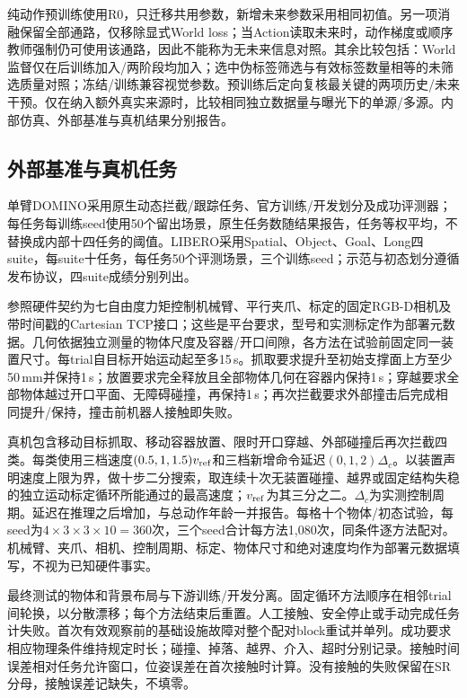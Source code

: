 纯动作预训练使用R0，只迁移共用参数，新增未来参数采用相同初值。另一项消融保留全部通路，仅移除显式World loss；当Action读取未来时，动作梯度或顺序教师强制仍可使用该通路，因此不能称为无未来信息对照。其余比较包括：World监督仅在后训练加入/两阶段均加入；选中伪标签筛选与有效标签数量相等的未筛选质量对照；冻结/训练兼容视觉参数。预训练后定向复核最关键的两项历史/未来干预。仅在纳入额外真实来源时，比较相同独立数据量与曝光下的单源/多源。内部仿真、外部基准与真机结果分别报告。



\subsection{外部基准与真机任务}
单臂DOMINO\cite{domino}采用原生动态拦截/跟踪任务、官方训练/开发划分及成功评测器；每任务每训练seed使用50个留出场景，原生任务数随结果报告，任务等权平均，不替换成内部十四任务的阈值。LIBERO\cite{libero}采用Spatial、Object、Goal、Long四suite，每suite十任务，每任务50个评测场景，三个训练seed；示范与初态划分遵循发布协议，四suite成绩分别列出。

参照硬件契约为七自由度力矩控制机械臂、平行夹爪、标定的固定RGB-D相机及带时间戳的Cartesian TCP接口；这些是平台要求，型号和实测标定作为部署元数据。几何依据独立测量的物体尺度及容器/开口间隙，各方法在试验前固定同一装置尺寸。每trial自目标开始运动起至多15\,s。抓取要求提升至初始支撑面上方至少50\,mm并保持1\,s；放置要求完全释放且全部物体几何在容器内保持1\,s；穿越要求全部物体越过开口平面、无障碍碰撞，再保持1\,s；再次拦截要求外部撞击后完成相同提升/保持，撞击前机器人接触即失败。

真机包含移动目标抓取、移动容器放置、限时开口穿越、外部碰撞后再次拦截四类。每类使用三档速度$(0.5,1,1.5)v_{\rm ref}$和三档新增命令延迟$(0,1,2)\Delta_c$。以装置声明速度上限为界，做十步二分搜索，取连续十次无装置碰撞、越界或固定结构失稳的独立运动标定循环所能通过的最高速度；$v_{\rm ref}$为其三分之二。$\Delta_c$为实测控制周期。延迟在推理之后增加，与总动作年龄一并报告。每格十个物体/初态试验，每seed为$4\times3\times3\times10=360$次，三个seed合计每方法1,080次，同条件逐方法配对。机械臂、夹爪、相机、控制周期、标定、物体尺寸和绝对速度均作为部署元数据填写，不视为已知硬件事实。

最终测试的物体和背景布局与下游训练/开发分离。固定循环方法顺序在相邻trial间轮换，以分散漂移；每个方法结束后重置。人工接触、安全停止或手动完成任务计失败。首次有效观察前的基础设施故障对整个配对block重试并单列。成功要求相应物理条件维持规定时长；碰撞、掉落、越界、介入、超时分别记录。接触时间误差相对任务允许窗口，位姿误差在首次接触时计算。没有接触的失败保留在SR分母，接触误差记缺失，不填零。

